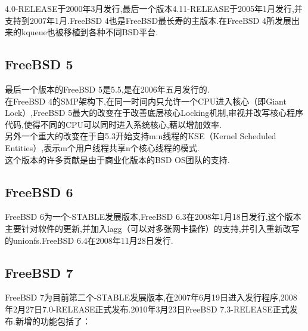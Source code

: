 \documentclass[a4paper,12pt,notitlepage]{article}
\begin{document}
	4.0-RELEASE于2000年3月发行,最后一个版本4.11-RELEASE于2005年1月发行,并支持到2007年1月.FreeBSD 4也是FreeBSD最长寿的主版本.在FreeBSD 4所发展出来的kqueue也被移植到各种不同BSD平台. \\
	
\subsection{FreeBSD 5}

	最后一个版本的FreeBSD 5是5.5,是在2006年五月发行的. \\

	在FreeBSD 4的SMP架构下,在同一时间内只允许一个CPU进入核心（即Giant Lock）,FreeBSD 5最大的改变在于改善底层核心Locking机制,审视并改写核心程序代码,使得不同的CPU可以同时进入系统核心,藉以增加效率. \\

	另外一个重大的改变在于自5.3开始支持m:n线程的KSE（Kernel Scheduled Entities）,表示m个用户线程共享n个核心线程的模式. \\

	这个版本的许多贡献是由于商业化版本的BSD OS团队的支持. \\
	

\subsection{FreeBSD 6}
	
	FreeBSD 6为一个-STABLE发展版本,FreeBSD 6.3在2008年1月18日发行,这个版本主要针对软件的更新,并加入lagg（可以对多张网卡操作）的支持,并引入重新改写的unionfs.FreeBSD 6.4在2008年11月28日发行. \\	
	
\subsection{FreeBSD 7}

	FreeBSD 7为目前第二个-STABLE发展版本,在2007年6月19日进入发行程序,2008年2月27日7.0-RELEASE正式发布.2010年3月23日FreeBSD 7.3-RELEASE正式发布.新增的功能包括了： \\
\end{document}
